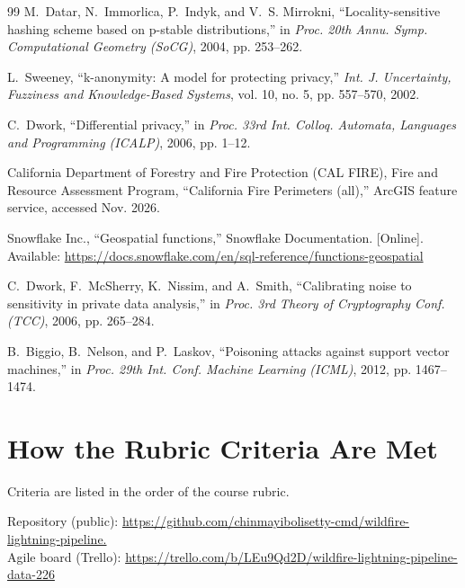 \documentclass[10pt,journal,compsoc]{IEEEtran}
\begin{document}
\begin{thebibliography}{99}
M.~Datar, N.~Immorlica, P.~Indyk, and V.~S. Mirrokni, ``Locality-sensitive hashing scheme based on p-stable distributions,'' in \textit{Proc. 20th Annu. Symp. Computational Geometry (SoCG)}, 2004, pp. 253--262.

L.~Sweeney, ``k-anonymity: A model for protecting privacy,'' \textit{Int. J. Uncertainty, Fuzziness and Knowledge-Based Systems}, vol. 10, no. 5, pp. 557--570, 2002.

C.~Dwork, ``Differential privacy,'' in \textit{Proc. 33rd Int. Colloq. Automata, Languages and Programming (ICALP)}, 2006, pp. 1--12.

California Department of Forestry and Fire Protection (CAL FIRE), Fire and Resource Assessment Program, ``California Fire Perimeters (all),'' ArcGIS feature service, accessed Nov. 2026.

Snowflake Inc., ``Geospatial functions,'' Snowflake Documentation. [Online]. Available: \url{https://docs.snowflake.com/en/sql-reference/functions-geospatial}

C.~Dwork, F.~McSherry, K.~Nissim, and A.~Smith, ``Calibrating noise to sensitivity in private data analysis,'' in \textit{Proc. 3rd Theory of Cryptography Conf. (TCC)}, 2006, pp. 265--284.

B.~Biggio, B.~Nelson, and P.~Laskov, ``Poisoning attacks against support vector machines,'' in \textit{Proc. 29th Int. Conf. Machine Learning (ICML)}, 2012, pp. 1467--1474.

\end{thebibliography}

\clearpage
\onecolumn
\appendices

\section{How the Rubric Criteria Are Met}
Criteria are listed in the order of the course rubric.

\noindent Repository (public): \url{https://github.com/chinmayibolisetty-cmd/wildfire-lightning-pipeline.}\\
Agile board (Trello): \url{https://trello.com/b/LEu9Qd2D/wildfire-lightning-pipeline-data-226}
\end{document}
